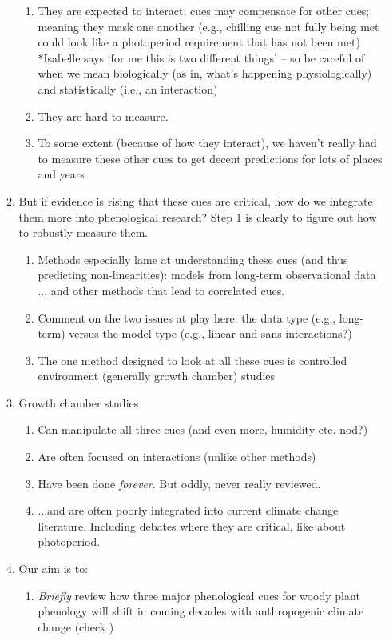 \documentclass[11pt,letterpaper]{article}
\begin{document}
\begin{enumerate}
\begin{enumerate}
\begin{enumerate}
\item They are expected to interact; cues may compensate for other cues; meaning they mask one another (e.g., chilling cue not fully being met could look like a photoperiod requirement that has not been met) *Isabelle says `for me this is two different things' -- so be careful of when we mean biologically (as in, what's happening physiologically) and statistically (i.e., an interaction)
\item They are hard to measure.
\item To some extent (because of how they interact), we haven't really had to measure these other cues to get decent predictions for lots of places and years
\end{enumerate}
\item But if evidence is rising that these cues are critical, how do we integrate them more into phenological research? Step 1 is clearly to figure out how to robustly measure them. 
\begin{enumerate}
\item Methods especially lame at understanding these cues (and thus predicting non-linearities): models from long-term observational data ... and other methods that lead to correlated cues. 
\item Comment on the two issues at play here: the data type (e.g., long-term) versus the model type (e.g., linear and sans interactions?)
\item The one method designed to look at all these cues is controlled environment (generally growth chamber) studies \citep{nagano2012,satake2013} %
\end{enumerate}
\item Growth chamber studies
\begin{enumerate}
\item Can manipulate all three cues (and even more, humidity etc. nod?)
\item Are often focused on interactions (unlike other methods)
\item Have been done \emph{forever}. But oddly, never really reviewed.
\item  ...and are often poorly integrated into current climate change literature. Including debates where they are critical, like about photoperiod. 
\end{enumerate}
\item Our aim is to:
\begin{enumerate}
\item \emph{Briefly} review how three major phenological cues for woody plant phenology will shift in coming decades with anthropogenic climate change (check \citet{primack2015})

\end{enumerate}
\end{enumerate}
\end{enumerate}
\end{document}
